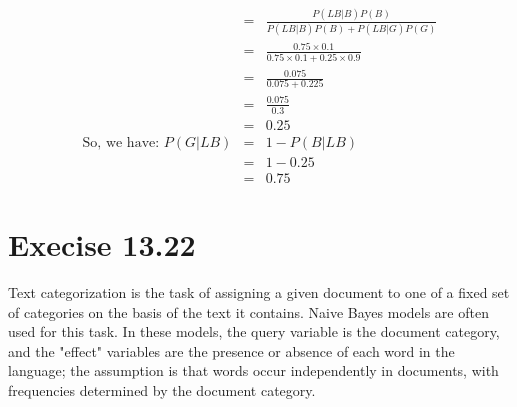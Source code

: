 \documentclass{article}
\begin{document}
\begin{enumerate}[a.]
{\begin{eqnarray*}
      & = & \frac{P(LB|B)P(B)}{P(LB|B)P(B) + P(LB|G)P(G)} \\
      & = & \frac{0.75\times 0.1}{0.75\times 0.1 + 0.25\times 0.9} \\
      & = & \frac{0.075}{0.075+0.225} \\ 
      & = & \frac{0.075}{0.3} \\
      & = & 0.25 \\ 
      \mbox{So, we have: } P(G|LB) & = & 1-P(B|LB) \\
      & = & 1-0.25 \\
      & = & 0.75
    \end{eqnarray*}
  }
\end{enumerate}

\section{Execise 13.22}
Text categorization is the task of assigning a given document to one
of a fixed set of categories on the basis of the text it
contains. Naive Bayes models are often used for this task. In these
models, the query variable is the document category, and the "effect"
variables are the presence or absence of each word in the language;
the assumption is that words occur independently in documents, with
frequencies determined by the document category.
\end{document}

